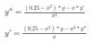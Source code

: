 \documentclass[10pt]{article}
\begin{document}
$y''=\frac{(0.25-x^{2})*y-x*y'}{x^{2}}$
\par
$y'=\frac{(0.25-x^{2})*y-x^{2}*y''}{x}$
\end{document}
